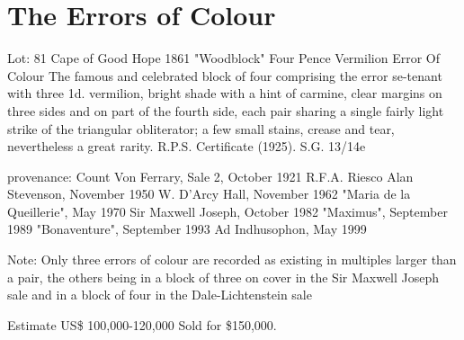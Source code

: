 \chapter{The Errors of Colour}    


Lot: 81 Cape of Good Hope 1861 "Woodblock" Four Pence Vermilion Error Of Colour The famous and celebrated block of four comprising the error se-tenant with three 1d. vermilion, bright shade with a hint of carmine, clear margins on three sides and on part of the fourth side, each pair sharing a single fairly light strike of the triangular obliterator; a few small stains, crease and tear, nevertheless a great rarity. R.P.S. Certificate (1925). S.G. 13/14e 



provenance: Count Von Ferrary, Sale 2, October 1921 R.F.A. Riesco Alan Stevenson, November 1950 W. D'Arcy Hall, November 1962 "Maria de la Queillerie", May 1970 Sir Maxwell Joseph, October 1982 "Maximus", September 1989 "Bonaventure", September 1993 Ad Indhusophon, May 1999 

Note: Only three errors of colour are recorded as existing in multiples larger than a pair, the others being in a block of three on cover in the Sir Maxwell Joseph sale and in a block of four in the Dale-Lichtenstein sale 

Estimate US\$ 100,000-120,000 Sold for \$150,000.      